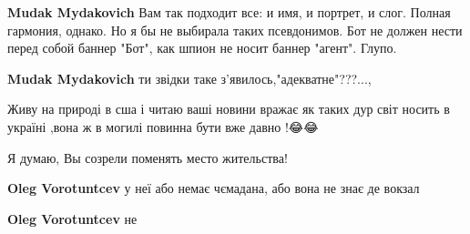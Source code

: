 \begin{itemize}
\begin{itemize}
\textbf{Mudak Mydakovich} Вам так подходит все: и имя, и портрет, и слог. Полная гармония, однако. Но я бы не выбирала таких псевдонимов. Бот не должен нести перед собой баннер "Бот", как шпион не носит баннер "агент". Глупо.

 
\textbf{Mudak Mydakovich} ти звідки таке з'явилось,"адекватне"???...,

 
Живу на природі в сша і читаю ваші новини вражає як таких дур світ носить в україні ,вона ж в могилі повинна бути вже давно !😂😂
\end{itemize}

 
Я думаю, Вы созрели поменять место жительства!

\begin{itemize}
 
\textbf{Oleg Vorotuntcev} у неї або немає чємадана, або вона не знає де вокзал

 
\textbf{Oleg Vorotuntcev} не

 

\end{itemize}
\end{itemize}
